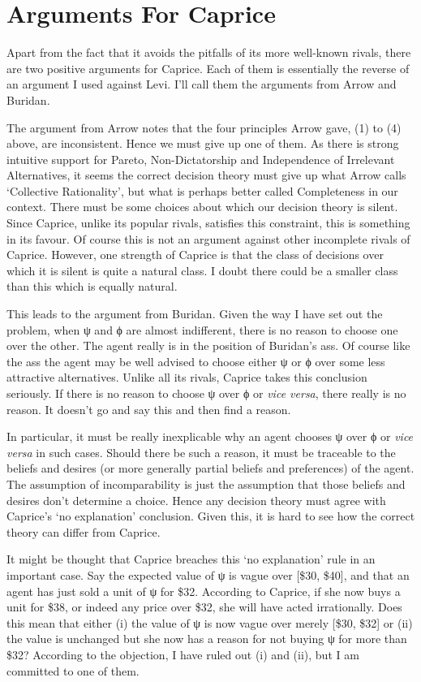 \documentclass[
  11pt,
  letterpaper,
  DIV=11,
  numbers=noendperiod,
  twoside]{scrartcl}
\begin{document}
\section{Arguments For Caprice}\label{arguments-for-caprice}

Apart from the fact that it avoids the pitfalls of its more well-known
rivals, there are two positive arguments for Caprice. Each of them is
essentially the reverse of an argument I used against Levi. I'll call
them the arguments from Arrow and Buridan.

The argument from Arrow notes that the four principles Arrow gave, (1)
to (4) above, are inconsistent. Hence we must give up one of them. As
there is strong intuitive support for Pareto, Non-Dictatorship and
Independence of Irrelevant Alternatives, it seems the correct decision
theory must give up what Arrow calls `Collective Rationality', but what
is perhaps better called Completeness in our context. There must be some
choices about which our decision theory is silent. Since Caprice, unlike
its popular rivals, satisfies this constraint, this is something in its
favour. Of course this is not an argument against other incomplete
rivals of Caprice. However, one strength of Caprice is that the class of
decisions over which it is silent is quite a natural class. I doubt
there could be a smaller class than this which is equally natural.

This leads to the argument from Buridan. Given the way I have set out
the problem, when ψ and ϕ are almost indifferent, there is no reason to
choose one over the other. The agent really is in the position of
Buridan's ass. Of course like the ass the agent may be well advised to
choose either ψ or ϕ over some less attractive alternatives. Unlike all
its rivals, Caprice takes this conclusion seriously. If there is no
reason to choose ψ over ϕ or \emph{vice versa}, there really is no
reason. It doesn't go and say this and then find a reason.

In particular, it must be really inexplicable why an agent chooses ψ
over ϕ or \emph{vice versa} in such cases. Should there be such a
reason, it must be traceable to the beliefs and desires (or more
generally partial beliefs and preferences) of the agent. The assumption
of incomparability is just the assumption that those beliefs and desires
don't determine a choice. Hence any decision theory must agree with
Caprice's `no explanation' conclusion. Given this, it is hard to see how
the correct theory can differ from Caprice.

It might be thought that Caprice breaches this `no explanation' rule in
an important case. Say the expected value of ψ is vague over {[}\$30,
\$40{]}, and that an agent has just sold a unit of ψ for \$32. According
to Caprice, if she now buys a unit for \$38, or indeed any price over
\$32, she will have acted irrationally. Does this mean that either (i)
the value of ψ is now vague over merely {[}\$30, \$32{]} or (ii) the
value is unchanged but she now has a reason for not buying ψ for more
than \$32? According to the objection, I have ruled out (i) and (ii),
but I am committed to one of them.
\end{document}
